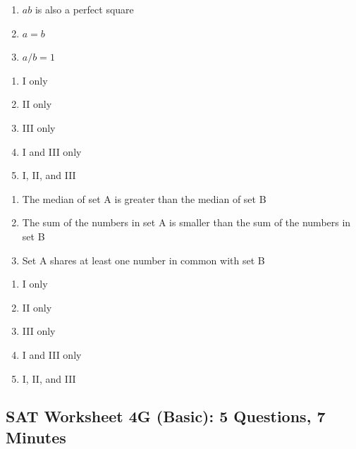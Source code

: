 \begin{multienumerate}
{\begin{enumerate}[label=\Roman*.]
\item $ab$ is also a perfect square
\item $a=b$
\item $a/b=1$
\end{enumerate}

\begin{enumerate}[label=(\Alph*)]
\item I only
\item II only
\item III only
\item I and III only
\item I, II, and III
\end{enumerate}}{\advanced

\begin{enumerate}[label=\Roman*.]
\item The median of set A is greater than the median of set B
\item The sum of the numbers in set A is smaller than the sum of the numbers in set B
\item Set A shares at least one number in common with set B
\end{enumerate}

\begin{enumerate}[label=(\Alph*)]
\item I only
\item II only
\item III only
\item I and III only
\item I, II, and III
\end{enumerate}}
\end{multienumerate}

\newpage
\subsection{SAT Worksheet 4G (Basic): 5 Questions, 7 Minutes}

